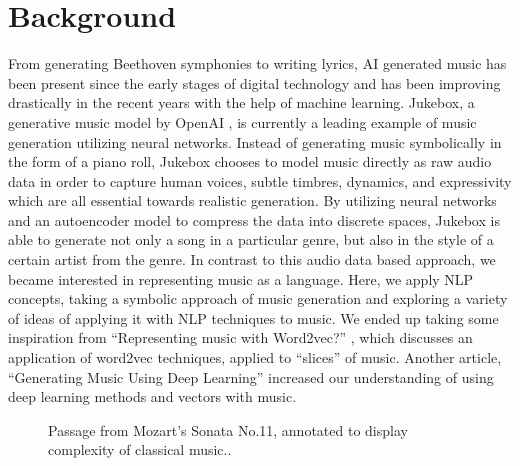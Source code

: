 \documentclass{article}
\begin{document}
\section{Background}
From generating Beethoven symphonies to writing lyrics, AI generated music has been present since the early stages of digital technology and has been improving drastically in the recent years with the help of machine learning. Jukebox, a generative music model by OpenAI  \cite{jukebox}, is currently a leading example of music generation utilizing neural networks. Instead of generating music symbolically in the form of a piano roll, Jukebox chooses to model music directly as raw audio data in order to capture human voices, subtle timbres, dynamics, and expressivity which are all essential towards realistic generation. By utilizing neural networks and an autoencoder model to compress the data into discrete spaces, Jukebox is able to generate not only a song in a particular genre, but also in the style of a certain artist from the genre. In contrast to this audio data based approach, we became interested in representing music as a language. Here, we apply NLP concepts, taking a symbolic approach of music generation and exploring a variety of ideas of applying it with NLP techniques to music. We ended up taking some inspiration from “Representing music with Word2vec?” \cite{word2vec}, which discusses an application of word2vec techniques, applied to “slices” of music. Another article, “Generating Music Using Deep Learning” \cite{deep-learning} increased our understanding of using deep learning methods and vectors with music.

\begin{figure}[ht]
\centering
{}
\caption{Passage from Mozart's Sonata No.11, annotated to display complexity of classical music.\cite{sheetmusic}.}
\end{figure}
\end{document}
